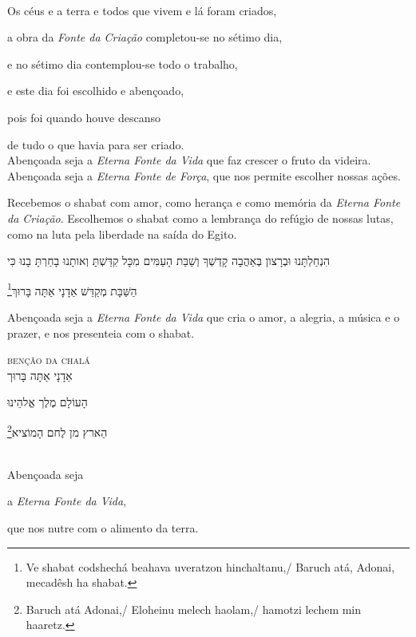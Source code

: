 \movetooddpage
\raggedright

\vspace*{1cm}

\textsc{}\\[15pt]

Os céus e a terra e todos que vivem e lá foram criados,

a obra da \emph{Fonte da Criação} completou-se no sétimo dia,

e no sétimo dia contemplou-se todo o trabalho,

e este dia foi escolhido e abençoado,

pois foi quando houve descanso

de tudo o que havia para ser criado.\\[10pt]

Abençoada seja a \emph{Eterna Fonte da Vida} que faz crescer o \qb{}fruto da videira.\\[10pt]

Abençoada seja a \emph{Eterna Fonte de Força}, que nos permite \qb{}escolher nossas ações.

Recebemos o shabat com amor, como herança e como memória da \emph{Eterna
Fonte da Criação}. Escolhemos o shabat como a lembrança do refúgio de
nossas lutas, como na luta pela liberdade na saída do Egito.\\[10pt]


\movetoevenpage
\raggedleft

\vspace*{1cm}


הִנְחַלְתָּנוּ וּבְרָצון בְּאַהֲבָה קָדְשְׁךָ וְשַׁבַּת הָעַמִּים מִכָּל קִדַּשְׁתָּ וְאותָנוּ בָחַרְתָּ בָנוּ כִּי

הַשַּׁבָּת מְקַדֵּשׁ אַדָנָי אַתָּה בָּרוּךְ\footnote{Ve shabat codshechá beahava uveratzon hinchaltanu,/
Baruch atá, Adonai, mecadêsh ha shabat.}

\movetooddpage
\raggedright

\vspace*{1cm}


Abençoada seja a \emph{Eterna Fonte da Vida} que cria o amor, a alegria,
a música e o prazer, e nos presenteia com o shabat.

\movetoevenpage
\raggedleft


\vspace*{1cm}

\textsc{benção da chalá}\\[15pt]

אַדָנָי אַתָּה בָּרוּך

הָעוֹלָם מֶלֶך אֱלהֵינוּ 

הַארץ מן לֶחם הָמוֹציא\footnote{Baruch atá Adonai,/ Eloheinu melech haolam,/ hamotzi lechem min haaretz.}

\movetooddpage
\raggedright

\vspace*{1cm}

\textsc{}\\[15pt]

Abençoada seja

a \emph{Eterna Fonte da Vida}, 

que nos nutre com o alimento da terra.
